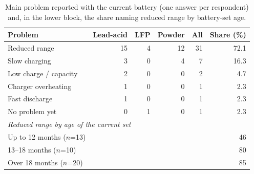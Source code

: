 \begin{table}[t]
\caption{Main problem reported with the current battery (one answer per respondent) and, in the lower block, the share naming reduced range by battery-set age.}
\label{tab:problems}
\centering\footnotesize
\begin{tabular}{lrrrrr}
\hline
Problem & Lead-acid & LFP & Powder & All & Share (\%) \\
\hline
Reduced range & 15 & 4 & 12 & 31 & 72.1 \\
Slow charging & 3 & 0 & 4 & 7 & 16.3 \\
Low charge / capacity & 2 & 0 & 0 & 2 & 4.7 \\
Charger overheating & 1 & 0 & 0 & 1 & 2.3 \\
Fast discharge & 1 & 0 & 0 & 1 & 2.3 \\
No problem yet & 0 & 1 & 0 & 1 & 2.3 \\
\hline
\multicolumn{6}{l}{\emph{Reduced range by age of the current set}} \\
Up to 12 months ($n$=13) & \multicolumn{4}{r}{} & 46 \\
13--18 months ($n$=10) & \multicolumn{4}{r}{} & 80 \\
Over 18 months ($n$=20) & \multicolumn{4}{r}{} & 85 \\
\hline
\end{tabular}
\end{table}
